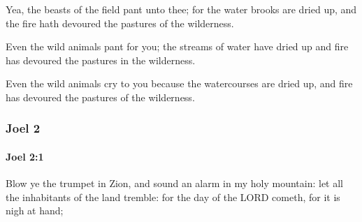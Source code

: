 			\begin{versebox}
					\item[BHS] 
					\item[LXX] 
					\item[ASV] Yea, the beasts of the field pant unto thee; for the water brooks are dried up, and the fire hath devoured the pastures of the wilderness.
					\item[NIV] Even the wild animals pant for you; the streams of water have dried up and fire has devoured the pastures in the wilderness.
					\item[NRSV] Even the wild animals cry to you because the watercourses are dried up, and fire has devoured the pastures of the wilderness.
			\end{versebox}
	\subsubsection{Joel 2} %
		\label{JOEL-2}

		\paragraph{Joel 2:1} %
			\label{JOEL-2-1}

			Blow ye the trumpet in Zion, and sound an alarm in my holy mountain: let all the inhabitants of the land tremble: for the day of the LORD cometh, for it is nigh at hand;

